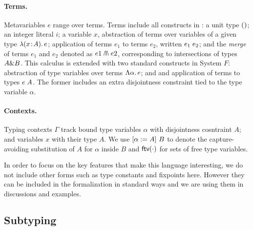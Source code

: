 \paragraph{Terms.} 
Metavariables $e$ range over terms.  
Terms include all constructs in \oldname: a unit type $()$; an integer literal $i$;
a variable $x$, abstraction of terms over variables of
a given type $\lambda (x \!:\! A).\, e$; application of terms $e_1$ to terms $e_2$, written
$e_1 \; e_2$; and the \emph{merge} of terms $e_1$ and $e_2 $ denoted as 
$e1 \merge e2$, corresponding to intersections of types $A \& B$.
This calculus is extended with two standard constructs in System $F$:
abstraction of type variables over terms $\Lambda \alpha.\, e$; and
and application of terms to types $e \; A$. 
The former includes an extra disjointness constraint tied to the type 
variable $\alpha$.

\paragraph{Contexts.} Typing contexts $ \Gamma $ track bound type variables
$\alpha$ with disjointness cosntraint $A$; and variables $x$ with their type $A$. 
We use $\lbrack \alpha := A \rbrack~ {B}$
to denote the capture-avoiding substitution of $A$ for $\alpha$ inside $B$ and
$\textsf{ftv}(\cdot)$ for sets of free type variables. %

In order to focus on the key features that make this language interesting, we do
not include other forms such as type constants and fixpoints here. 
However they can be included in the formalization in
standard ways and we are using them in discussions and examples. %


\subsection{Subtyping}



